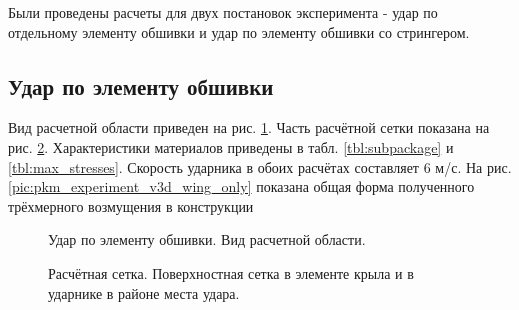 Были проведены расчеты для двух постановок эксперимента - удар по отдельному элементу обшивки и удар по элементу обшивки со стрингером.

\clearpage
\newpage


\subsection{Удар по элементу обшивки}

Вид расчетной области приведен на рис. \ref{pic:wing_only_scene}. Часть расчётной сетки показана на рис. \ref{pic:wing_mesh_sample}. Характеристики материалов приведены в табл. \ref{tbl:subpackage} и \ref{tbl:max_stresses}. Скорость ударника в обоих расчётах составляет 6 м/с. На рис. \ref{pic:pkm_experiment_v3d_wing_only} показана общая форма полученного трёхмерного возмущения в конструкции

\begin{figure}[htp]
\caption{Удар по элементу обшивки. Вид расчетной области.}
\label{pic:wing_only_scene}
\end{figure}

\begin{figure}[htp]
\caption{Расчётная сетка. Поверхностная сетка в элементе крыла и в ударнике в районе места удара.}
\label{pic:wing_mesh_sample}
\end{figure}

